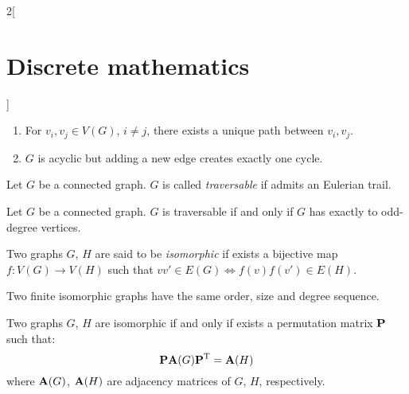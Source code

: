 \documentclass[../../../main.tex]{subfiles}
\begin{document}
\begin{multicols}{2}[\section{Discrete mathematics}]
\begin{proposition}
\begin{enumerate}
      \item For $v_i,v_j\in V(G)$, $i\ne j$, there exists a unique path between $v_i,v_j$.
      \item $G$ is acyclic but adding a new edge creates exactly one cycle.
    \end{enumerate}
  \end{proposition}
  \begin{definition}
    Let $G$ be a connected graph. $G$ is called \emph{traversable} if admits an Eulerian trail.
  \end{definition}
  \begin{theorem}
    Let $G$ be a connected graph. $G$ is traversable if and only if $G$ has exactly to odd-degree vertices.
  \end{theorem}
  \begin{definition}
    Two graphs $G$, $H$ are said to be \emph{isomorphic} if exists a bijective map $f:V(G)\rightarrow V(H)$ such that $vv'\in E(G)\iff f(v)f(v')\in E(H)$.
  \end{definition}
  \begin{proposition}
    Two finite isomorphic graphs have the same order, size and degree sequence.
  \end{proposition}
  \begin{theorem}
    Two graphs $G$, $H$ are isomorphic if and only if exists a permutation matrix $\boldsymbol{\mathrm{P}}$ such that: $$\boldsymbol{\mathrm{P}}\boldsymbol{\mathrm{A}}(G)\vb{\boldsymbol{\mathrm{P}}}^{\mathrm{T}}=\boldsymbol{\mathrm{A}}(H)$$ where $\boldsymbol{\mathrm{A}}(G)$, $\boldsymbol{\mathrm{A}}(H)$ are adjacency matrices of $G$, $H$, respectively.
  \end{theorem}

\end{multicols}
\end{document}
